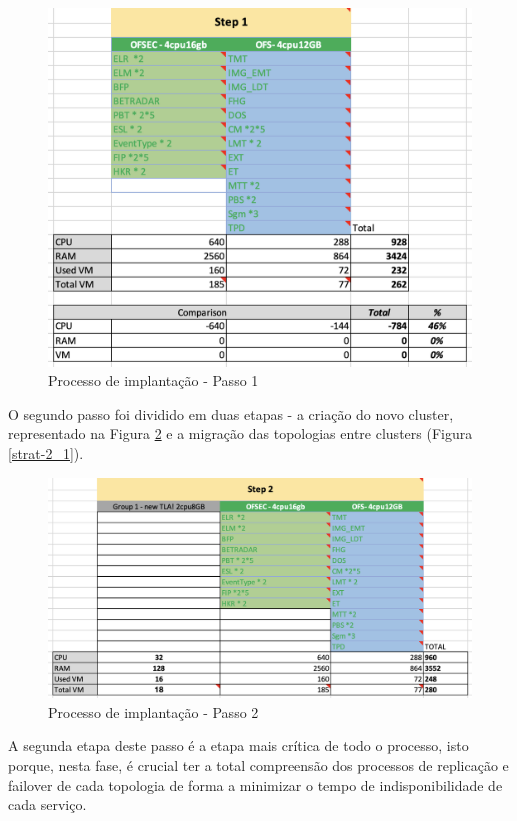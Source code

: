 \begin{figure}[H]
  \centerline{\includegraphics[scale=0.5]{media/content/analise/strat-1.png}}
  \caption{Processo de implantação - Passo 1}
  \label{strat-1}
\end{figure}

O segundo passo foi dividido em duas etapas - a criação do novo \gls{cluster}, representado na 
Figura \ref{strat-2} e a migração das topologias entre \glspl{cluster} (Figura \ref{strat-2_1}).

\begin{figure}[H]
  \centerline{\includegraphics[scale=0.5]{media/content/analise/strat-2.png}}
  \caption{Processo de implantação - Passo 2}
  \label{strat-2}
\end{figure}

A segunda etapa deste passo é a etapa mais crítica de todo o processo, isto porque, nesta fase, é
crucial ter a total compreensão dos processos de replicação e \gls{failover} de cada topologia de
forma a minimizar o tempo de indisponibilidade de cada serviço.

